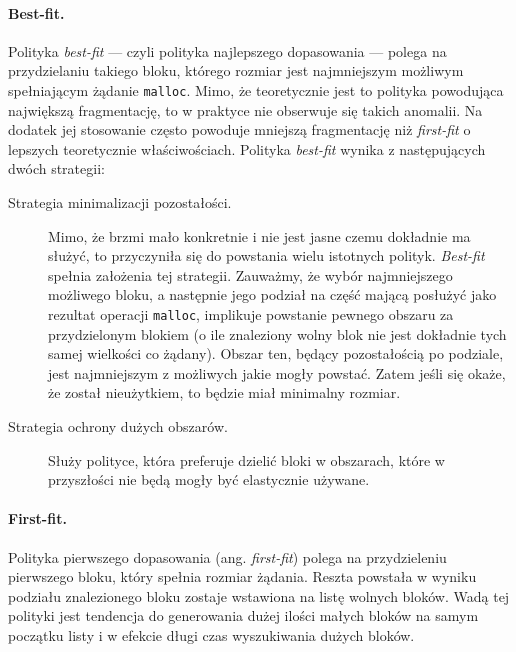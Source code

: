 \documentclass[12pt,a4paper,titlepage,twoside]{mwart}
\begin{document}
\paragraph{Best-fit.}

Polityka \textit{best-fit} --- czyli polityka najlepszego dopasowania --- polega
na przydzielaniu takiego bloku, którego rozmiar jest najmniejszym możliwym
spełniającym żądanie \texttt{malloc}. Mimo, że teoretycznie jest to polityka
powodująca największą fragmentację, to w praktyce nie obserwuje się takich
anomalii. Na dodatek jej stosowanie często powoduje mniejszą fragmentację niż
\textit{first-fit} o lepszych teoretycznie właściwościach. Polityka
\textit{best-fit} wynika z następujących dwóch strategii:
\vspace{-1ex}

\begin{description}
\item[Strategia minimalizacji pozostałości.] Mimo, że brzmi mało konkretnie i
nie jest jasne czemu dokładnie ma służyć, to przyczyniła się do powstania wielu
istotnych polityk. \textit{Best-fit} spełnia założenia tej strategii. Zauważmy,
że wybór najmniejszego możliwego bloku, a następnie jego podział na część
mającą posłużyć jako rezultat operacji \texttt{malloc}, implikuje powstanie
pewnego obszaru za przydzielonym blokiem (o ile znaleziony wolny blok nie jest
dokładnie tych samej wielkości co żądany). Obszar ten, będący pozostałością po
podziale, jest najmniejszym z możliwych jakie mogły powstać. Zatem jeśli się
okaże, że został nieużytkiem, to będzie miał minimalny rozmiar.
\vspace{1ex}

\item[Strategia ochrony dużych obszarów.] Służy polityce, która preferuje
dzielić bloki w obszarach, które w przyszłości nie będą mogły być elastycznie
używane.
\end{description}

\paragraph{First-fit.}

Polityka pierwszego dopasowania (ang. \textit{first-fit}) polega na
przydzieleniu pierwszego bloku, który spełnia rozmiar żądania. Reszta powstała
w wyniku podziału znalezionego bloku zostaje wstawiona na listę wolnych bloków.
Wadą tej polityki jest tendencja do generowania dużej ilości małych bloków na
samym początku listy i w efekcie długi czas wyszukiwania dużych bloków.
\end{document}

